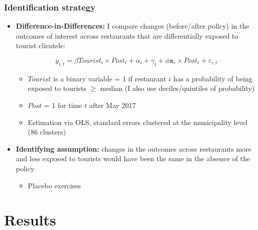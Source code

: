 \documentclass[aspectratio=169]{beamer}
\begin{document}
\begin{frame}
\frametitle{Identification strategy}
\begin{itemize}
\item<1-> \textbf{Difference-in-Differences:} I compare changes (before/after policy) in the outcomes of interest across restaurants that are differentially exposed to tourist clientele:

\[y_{i,t}=\beta Tourist_{i}\times Post_{t}+\alpha_{i}+\gamma_{t}+\phi \mathbf{x}_{i}\times Post_{t}+\varepsilon_{i,t}\]

\begin{itemize}

\item $Tourist$ is a binary variable = 1 if restaurant $i$ has a probability of being exposed to tourists $\geq$ median (I also use deciles/quintiles of probability)

\item $Post$ = 1 for time $t$ after May 2017 



\item Estimation via OLS, standard errors clustered at the municipality level (86 clusters)


\end{itemize}

\vspace{2.5mm}
\item<2> \textbf{Identifying assumption:} changes in the outcomes across restaurants more and less exposed to tourists would have been the same in the absence of the policy

\begin{itemize}
\item Placebo exercises
\end{itemize}

\end{itemize}

\end{frame}

\section{Results}
\end{document}
